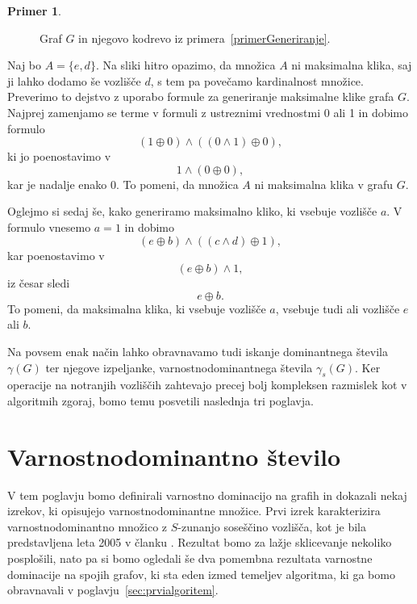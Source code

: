 \documentclass[12pt,a4paper,twoside]{article}
\theoremstyle{definition} %
\newtheorem{primer}[definicija]{Primer}
\theoremstyle{plain} %
\numberwithin{equation}{section}  %
\begin{document}
\begin{enumerate}[label=($\roman*$)]
\begin{primer}
\begin{figure}[h!]
\caption{Graf $G$ in njegovo kodrevo iz primera~\ref{primerGeneriranje}.}
\label{fig:primerGeneriranjaFormule}
\end{figure}

Naj bo  $A = \{e, d\}$. Na sliki hitro opazimo, da množica $A$ ni maksimalna klika, saj ji lahko dodamo še vozlišče $d$, s tem pa povečamo kardinalnost množice. Preverimo to dejstvo z uporabo formule za generiranje maksimalne klike grafa $G$. Najprej zamenjamo se terme v formuli z ustreznimi vrednostmi 0 ali 1 in dobimo formulo
$$(1 \oplus 0) \land ((0 \land 1) \oplus 0),$$ ki jo poenostavimo v $$1 \land (0 \oplus 0),$$ kar je nadalje enako 0. To pomeni, da množica $A$ ni maksimalna klika v grafu $G$.

Oglejmo si sedaj še, kako generiramo maksimalno kliko, ki vsebuje vozlišče $a$. V formulo vnesemo $a=1$ in dobimo $$(e \oplus b) \land ((c \land d) \oplus 1),$$ kar poenostavimo v $$(e \oplus b) \land 1,$$ iz česar sledi $$e \oplus b.$$
To pomeni, da maksimalna klika, ki vsebuje vozlišče $a$, vsebuje tudi ali vozlišče $e$ ali $b$.
\end{primer}
\end{enumerate}

Na povsem enak način lahko obravnavamo tudi iskanje dominantnega števila $\gamma(G)$ ter njegove izpeljanke, varnostnodominantnega števila $\gamma_s(G)$. Ker operacije na notranjih vozliščih zahtevajo precej bolj kompleksen razmislek kot v algoritmih zgoraj, bomo temu posvetili naslednja tri poglavja.


\section{Varnostnodominantno število}\label{sec:varnostnadominacija}
V tem poglavju bomo definirali varnostno dominacijo na grafih in dokazali nekaj izrekov, ki opisujejo varnostnodominantne množice. Prvi izrek karakterizira varnostnodominantno množico z $S$-zunanjo soseščino vozlišča, kot je bila predstavljena leta 2005 v članku \cite{cockayne2005protection}. Rezultat bomo za lažje sklicevanje nekoliko posplošili, nato pa si bomo ogledali še dva pomembna rezultata varnostne dominacije na spojih grafov, ki sta eden izmed temeljev algoritma, ki ga bomo obravnavali v poglavju~\ref{sec:prvialgoritem}.
\end{document}
